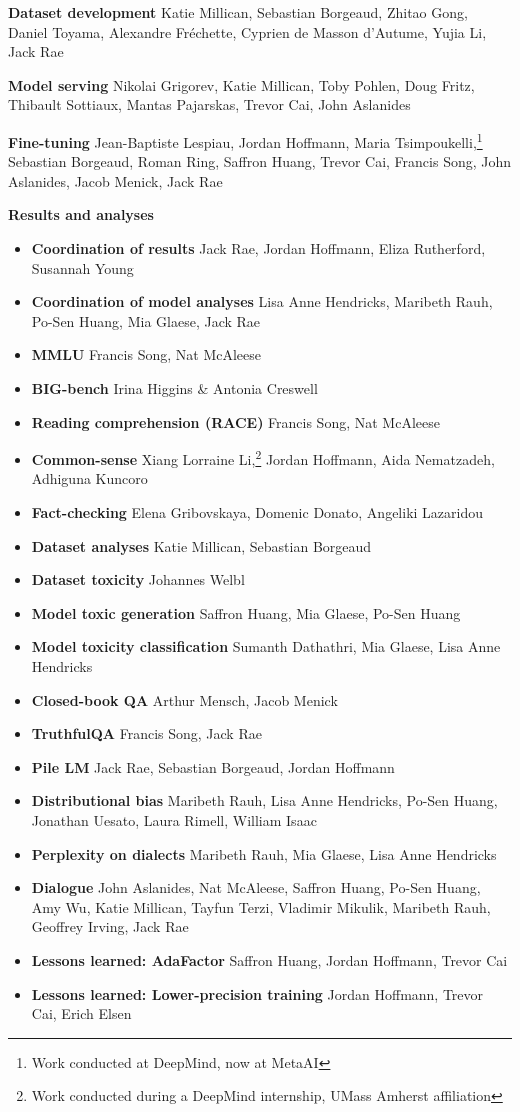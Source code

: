 \documentclass[11pt, a4paper, logo, internal, copyright, nonumbering]{deepmind}
\newcommand{\bigbench}{BIG-bench\xspace}
\begin{document}
\noindent \textbf{Dataset development}
Katie Millican, Sebastian Borgeaud, Zhitao Gong, Daniel Toyama, Alexandre Fr\'echette, Cyprien de Masson d’Autume, Yujia Li, Jack Rae

\noindent \textbf{Model serving}
Nikolai Grigorev, Katie Millican, Toby Pohlen, Doug Fritz, Thibault Sottiaux, Mantas Pajarskas, Trevor Cai, John Aslanides

\noindent \textbf{Fine-tuning}
Jean-Baptiste Lespiau, Jordan Hoffmann, Maria Tsimpoukelli,\footnote{Work conducted at DeepMind, now at MetaAI} Sebastian Borgeaud, Roman Ring, Saffron Huang, Trevor Cai, Francis Song, John Aslanides, Jacob Menick, Jack Rae

\noindent \textbf{Results and analyses}
\begin{itemize}[label={},noitemsep,topsep=0pt]
\item \textbf{Coordination of results}
Jack Rae, Jordan Hoffmann, Eliza Rutherford, Susannah Young
\item  \textbf{Coordination of model analyses}
Lisa Anne Hendricks, Maribeth Rauh, Po-Sen Huang, Mia Glaese, Jack Rae
\item  \textbf{MMLU}
Francis Song, Nat McAleese
\item \textbf{\bigbench}
Irina Higgins \& Antonia Creswell
\item \textbf{Reading comprehension (RACE)}
Francis Song, Nat McAleese
\item \textbf{Common-sense}
Xiang Lorraine Li,\footnote{Work conducted during a DeepMind internship, UMass Amherst affiliation}  Jordan Hoffmann,  Aida Nematzadeh, Adhiguna Kuncoro
\item \textbf{Fact-checking}
Elena Gribovskaya, Domenic Donato, Angeliki Lazaridou
\item \textbf{Dataset analyses}
Katie Millican, Sebastian Borgeaud
\item \textbf{Dataset toxicity}
Johannes Welbl
\item \textbf{Model toxic generation}
Saffron Huang, Mia Glaese, Po-Sen Huang
\item \textbf{Model toxicity classification}
Sumanth Dathathri, Mia Glaese, Lisa Anne Hendricks
\item \textbf{Closed-book QA}
Arthur Mensch, Jacob Menick
\item \textbf{TruthfulQA}
Francis Song, Jack Rae
\item \textbf{Pile LM}
Jack Rae, Sebastian Borgeaud, Jordan Hoffmann
\item \textbf{Distributional bias}
Maribeth Rauh, Lisa Anne Hendricks, Po-Sen Huang, Jonathan Uesato, Laura Rimell, William Isaac
\item \textbf{Perplexity on dialects}
Maribeth Rauh, Mia Glaese, Lisa Anne Hendricks
\item \textbf{Dialogue}
John Aslanides, Nat McAleese, Saffron Huang, Po-Sen Huang, Amy Wu, Katie Millican, Tayfun Terzi, Vladimir Mikulik, Maribeth Rauh, Geoffrey Irving, Jack Rae
\item \textbf{Lessons learned: AdaFactor}
Saffron Huang, Jordan Hoffmann, Trevor Cai
\item \textbf{Lessons learned: Lower-precision training}
Jordan Hoffmann, Trevor Cai, Erich Elsen
\end{itemize}
\end{document}
